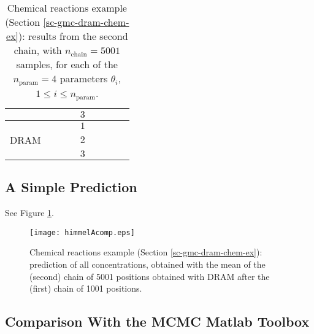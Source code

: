 \begin{table}[h!]
\begin{center}
\begin{tabular}{|c|c|c|c|c|c|c|c|c|}
\cline{5-9}
       &          &                        &                        & $3$ &                          &                                &                        &                               \\
\hline
\hline
       &          &                        &                        & $1$ &                          &                                &                        &                               \\
\cline{5-9}
DRAM   &          &                        &                        & $2$ &                          &                                &                        &                               \\
\cline{5-9}
       &          &                        &                        & $3$ &                          &                                &                        &                               \\
\hline
\end{tabular}
\caption{Chemical reactions example (Section \ref{sc-gmc-dram-chem-ex}):
results from the second chain, with $n_{\text{chain}}=5001$ samples,
for each of the $n_{\text{param}}=4$ parameters $\theta_i$, $1\leqslant i\leqslant n_{\text{param}}$.
}
\label{tab-dram-chem-ex-results-2}
\end{center}
\end{table}

\clearpage
\subsection{A Simple Prediction}

See Figure \ref{fig-dram-chem-ex-prediction}.

\begin{figure}[h!]
\begin{center}
\texttt{[image: himmelAcomp.eps]}
\end{center}
\caption{Chemical reactions example (Section \ref{sc-gmc-dram-chem-ex}):
prediction of all concentrations, obtained with the mean of the (second) chain of 5001 positions obtained with DRAM
after the (first) chain of 1001 positions.
}
\label{fig-dram-chem-ex-prediction}
\end{figure}

\clearpage
\subsection{Comparison With the MCMC Matlab Toolbox}

